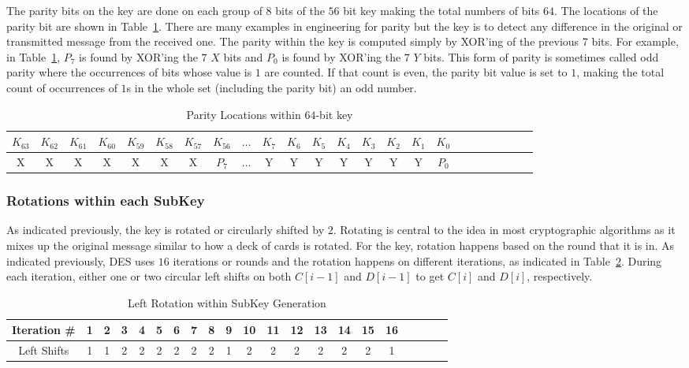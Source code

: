 \documentclass{article}
\begin{document}
The parity bits on the key are done on each group of $8$ bits of the
$56$ bit key making
the total numbers of bits $64$. The locations of the parity bit are
shown in Table~\ref{parity.tbl}.  There are many examples in
engineering for parity but the key is to detect any difference in the
original or transmitted message from the received one.  The parity
within the key is computed simply by XOR'ing of the previous 7 bits.
For example, in Table~\ref{parity.tbl}, $P_7$ is found by XOR'ing the
$7$ $X$ bits and $P_0$ is found by XOR'ing the $7$ $Y$ bits.  This
form of parity is sometimes called odd parity where the occurrences
of bits whose value is $1$ are counted. If that count is even, the parity
bit value is set to $1$, making the total count of occurrences of $1$s in
the whole set (including the parity bit) an odd number.
\begin{table}
  \centering
  {\scriptsize
\begin{tabular}{|c|c|c|c|c|c|c|c|c|c|c|c|c|c|c|c|c|c|c|c|c|c|c|c|} \hline
  $K_{63}$ & $K_{62}$ & $K_{61}$ & $K_{60}$ & $K_{59}$ & $K_{58}$ &
  $K_{57}$ & $K_{56}$ & $\ldots$ &
  $K_{7}$ & $K_{6}$ & $K_{5}$ & $K_{4}$ & $K_{3}$ & $K_{2}$ &
  $K_{1}$ & $K_{0}$ \\ \hline \hline
  X & X & X & X & X & X & X & $P_7$ & $\ldots$ & Y & Y & Y & Y & Y & Y & Y
  & $P_0$ \\ \hline
\end{tabular}
  }
  \caption{Parity Locations within $64$-bit key}
  \label{parity.tbl}
\end{table}

\subsubsection{Rotations within each SubKey}

As indicated previously, the key is rotated or circularly shifted by
$2$.  Rotating is central to the idea in most cryptographic algorithms
as it mixes up the original message similar to how a deck of cards is
rotated.  For the key, rotation happens based on the round that it is
in.  As indicated previously, DES uses $16$ iterations or rounds
and the rotation
happens on different iterations, as indicated in Table~\ref{rotateK.tbl}.
During each iteration, either one or two
circular left shifts on both $C[i-1]$ and 
$D[i-1]$ to get $C[i]$ and $D[i]$, respectively.
\begin{table}
  \centering
  \begin{tabular}{|c|c|c|c|c|c|c|c|c|c|c|c|c|c|c|c|c|c|c|c|c|}\hline
    Iteration \# & 1 & 2 & 3 & 4 & 5 & 6 & 7 &  8 & 9 & 10 & 11 & 12 &
    13 & 14 & 15 & 16 \\ \hline \hline    
    Left Shifts & 1 & 1 & 2 & 2 & 2 & 2 & 2 & 2 & 1 & 2 & 2 & 2 & 2 &
    2 & 2 & 1 \\ \hline
  \end{tabular}
  \caption{Left Rotation within SubKey Generation}
  \label{rotateK.tbl}
\end{table}
\end{document}
